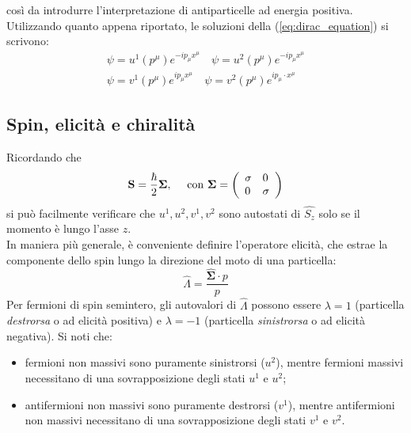 \documentclass{subnucbo}
\begin{document}
così da introdurre l'interpretazione di antiparticelle ad energia positiva. Utilizzando quanto appena riportato, le soluzioni della (\ref{eq:dirac_equation}) si scrivono:
\begin{equation}
        \begin{align}
                \psi = u ^ { 1 } \left( p ^ { \mu } \right) e ^ { - i p_{\mu} x^{\mu} } \quad \psi = u ^ { 2 } \left( p ^ { \mu } \right) e ^ { - i p_{\mu} x^{\mu} } \\ \psi = v ^ { 1 } \left( p ^ { \mu } \right) e ^ {  i p_{\mu}  x^{\mu} } \quad \psi = v ^ { 2 } \left( p ^ { \mu } \right) e ^ {  i p_{\mu} \cdot x^{\mu} }
        \end{align}
        \label{eq:u1u2v1v2}
\end{equation}

\subsection{Spin, elicità e chiralità}
Ricordando che
\begin{equation}
        \mathbf { S } = \frac { \hbar } { 2 } \mathbf { \Sigma } , \quad \text { con } \mathbf { \Sigma } = \left( \begin{array} { l l } { \sigma } & { 0 } \\ { 0 } & { \sigma } \end{array} \right)
\end{equation}
si può facilmente verificare che $u^{1}, u^{2}, v^{1}, v^{2}$ sono autostati di $\hat { S _ { z } }$ solo se il momento è lungo l'asse $z$. \\
In maniera più generale, è conveniente definire l'operatore elicità, che estrae la componente dello spin lungo la direzione del moto di una particella:
\begin{equation}
        \hat { \Lambda }  = \frac { \hat { \mathbf { \Sigma } } \cdot p } { p }
        \label{eq:helicity}
\end{equation}
Per fermioni di spin semintero, gli autovalori di $\hat{\Lambda}$ possono essere $\lambda=1$ (particella \textit{destrorsa} o ad elicità positiva) e $\lambda=-1$ (particella \textit{sinistrorsa} o ad elicità negativa). Si noti che:
\begin{itemize}
        \item fermioni non massivi sono puramente sinistrorsi ($u^{2}$), mentre fermioni massivi necessitano di una sovrapposizione degli stati $u^{1}$ e $u^{2}$;
        \item antifermioni non massivi sono puramente destrorsi ($v^{1}$), mentre antifermioni non massivi necessitano di una sovrapposizione degli stati $v^{1}$ e $v^{2}$.
\end{itemize}
\end{document}
